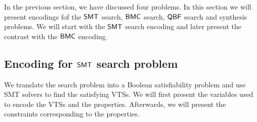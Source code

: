 %
%
%

In the previous section, we have discussed four problems.
%
In this section we will present encodings fof the
$\mathsf{SMT}$ search, $\mathsf{BMC}$ search, $\mathsf{QBF}$ search and synthesis problems.
%
We will start with the $\mathsf{SMT}$ search encoding and later present the
contrast with the $\mathsf{BMC}$ encoding.

\subsection{Encoding for $\mathsf{SMT}$ search problem}
\label{enc:smt}


We translate the search problem into a Boolean satisfiability
problem and use SMT solvers to find the satisfying VTSs.
%
We will first present the variables used to encode the
VTSs and the properties.
%
Afterwards, we will present the constraints corresponding to the
properties.

